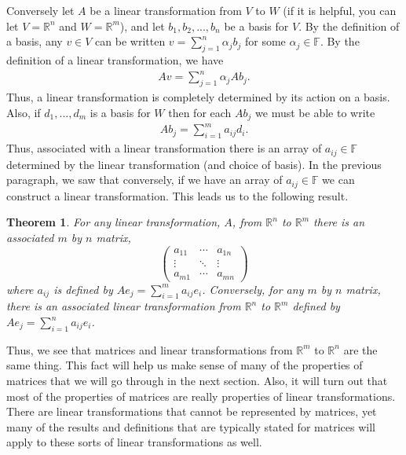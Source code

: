 \documentclass[12pt,reqno]{amsart}
\def\F{\mathbb{F}}
\def\R{\mathbb{R}}
\newcommand{\gmatrix}[1]{\begin{pmatrix} {#1}_{11} & \cdots &
    {#1}_{1n} \\ \vdots & \ddots & \vdots \\ {#1}_{m1} & \cdots &
    {#1}_{mn} \end{pmatrix}}
\newtheorem{theorem}{Theorem}[section]
\theoremstyle{definition}
\begin{document}
Conversely let $A$ be a linear transformation from $V$ to $W$ (if it
is helpful, you can let $V=\R^n$ and $W=\R^m$), and let $b_1, b_2,
..., b_n$ be a basis for $V$. By the definition of a basis, any $v \in
V$ can be written $v = \sum_{j=1}^n \alpha_j b_j$ for some $\alpha_j
\in \F$. By the definition of a linear transformation, we have
\begin{align*}
  A v = \sum_{j=1}^n \alpha_j A b_j. 
\end{align*}
Thus, a linear transformation is completely determined by its action
on a basis. Also, if $d_1, ..., d_m$ is a basis for $W$ then for each
$A b_j$ we must be able to write
\begin{align*}
  A b_j = \sum_{i=1}^m a_{ij} d_i.
\end{align*}
Thus, associated with a linear transformation there is an array of
$a_{ij} \in \F$ determined by the linear transformation (and choice of
basis). In the previous paragraph, we saw that conversely, if we have
an array of $a_{ij} \in \F$ we can construct a linear
transformation. This leads us to the following result.
\begin{theorem}
  For any linear transformation, $A$, from $\R^n$ to $\R^m$ there is an
  associated $m$ by $n$ matrix,
  \[ 
  \gmatrix{a}
  \]
  where $a_{ij}$ is defined by $A e_j = \sum_{i=1}^m a_{ij}
  e_i$. Conversely, for any $m$ by $n$ matrix, there is an associated
  linear transformation from $\R^n$ to $\R^m$ defined by $A e_j =
  \sum_{i=1}^n a_{ij} e_i$.
\end{theorem}
Thus, we see that matrices and linear transformations from $\R^m$ to
$\R^n$ are the same thing. This fact will help us make sense of many
of the properties of matrices that we will go through in the next
section. Also, it will turn out that most of the properties of
matrices are really properties of linear transformations. There are
linear transformations that cannot be represented by matrices, yet
many of the results and definitions that are typically stated for
matrices will apply to these sorts of linear transformations as
well. 
\end{document}
